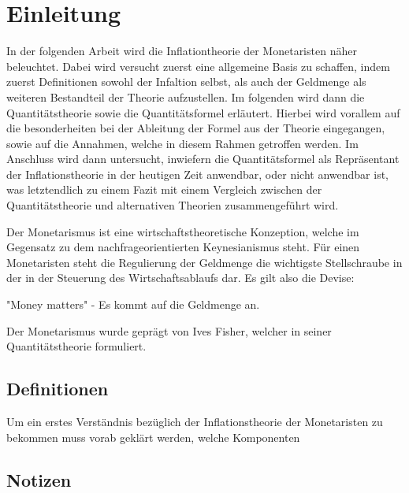 \documentclass[
	12pt,
	BCOR=5mm,
	DIV=12,
	headinclude=on,
	footinclude=off,
	parskip=half,
	bibliography=totoc,
	listof=entryprefix,
	toc=listof,
	numbers=noenddot,
]{scrreprt}
\begin{document}


\tableofcontents

\clearpage

\ihead{\chaptername~\thechapter} %

\chapter{Einleitung}

In der folgenden Arbeit wird die Inflationtheorie der Monetaristen näher beleuchtet. Dabei wird versucht zuerst eine allgemeine Basis zu schaffen, indem zuerst Definitionen sowohl der Infaltion selbst, als auch der Geldmenge als weiteren Bestandteil der Theorie aufzustellen. Im folgenden wird dann die Quantitätstheorie sowie die Quantitätsformel erläutert. Hierbei wird vorallem auf die besonderheiten bei der Ableitung der Formel aus der Theorie eingegangen, sowie auf die Annahmen, welche in diesem Rahmen getroffen werden. Im Anschluss wird dann untersucht, inwiefern die Quantitätsformel als Repräsentant der Inflationstheorie in der heutigen Zeit anwendbar, oder nicht anwendbar ist, was letztendlich zu einem Fazit mit einem Vergleich zwischen der Quantitätstheorie und alternativen Theorien zusammengeführt wird.

Der Monetarismus ist eine wirtschaftstheoretische Konzeption, welche im Gegensatz zu dem nachfrageorientierten Keynesianismus steht. Für einen Monetaristen steht die Regulierung der Geldmenge die wichtigste Stellschraube in der in der Steuerung des Wirtschaftsablaufs dar. Es gilt also die Devise:

\begin{center}
    "Money matters" - Es kommt auf die Geldmenge an.
\end{center}

Der Monetarismus wurde geprägt von Ives Fisher, welcher in seiner Quantitätstheorie formuliert.



\section{Definitionen}

Um ein erstes Verständnis bezüglich der Inflationstheorie der Monetaristen zu bekommen muss vorab geklärt werden, welche Komponenten

\section*{Notizen}
\end{document}
